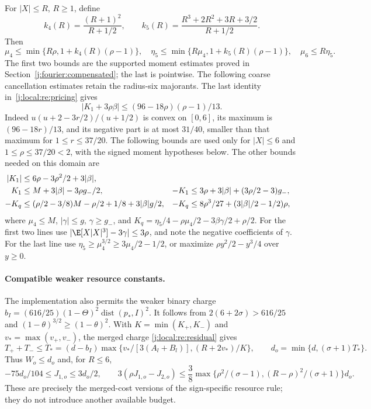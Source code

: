 For $|X|\le R$, $R\ge1$, define
\[
 k_4(R)=\frac{(R+1)^2}{R+1/2},\qquad
 k_5(R)=\frac{R^3+2R^2+3R+3/2}{R+1/2}.
\]
Then
\begin{equation}\label{j:local:mom:universal-moments}
 \mu_4\le\min\{R\rho,1+k_4(R)(\rho-1)\},\quad
 \eta_5\le\min\{R\mu_4,1+k_5(R)(\rho-1)\},\quad
 \mu_6\le R\eta_5.
\end{equation}
The first two bounds are the supported moment estimates proved in
Section~\ref{j:fourier:compensated}; the last is pointwise.
The following coarse cancellation estimates retain the radius-six majorants.
The last identity in~\eqref{j:local:re:pricing} gives
\begin{equation}\label{j:local:mom:K-cancellation}
 |K_1+3\rho\beta|\le(96-18\rho)(\rho-1)/13.
\end{equation}
Indeed $u(u+2-3r/2)/(u+1/2)$ is convex on $[0,6]$, its maximum is
$(96-18r)/13$, and its negative part is at most $31/40$, smaller than that
maximum for $1\le r\le37/20$.
The following bounds are used only for $|X|\le6$ and
$1\le\rho\le37/20<2$, with the signed moment hypotheses below.
The other bounds needed on this domain are
\begin{align}
 |K_1|&\le6\rho-3\rho^2/2+3|\beta|,\notag\\
 K_1&\le M+3|\beta|-3\rho g_-/2,&
 -K_1&\le3\rho+3|\beta|+(3\rho/2-3)g_-,\notag\\
 -K_q&\le(\rho/2-3/8)M-\rho/2+1/8+3|\beta|g/2,&
 -K_q&\le8\rho^3/27+(3|\beta|/2-1/2)\rho,               \label{j:local:mom:K-bounds}
\end{align}
where $\mu_4\le M$, $|\gamma|\le g$, $\gamma\ge g_-$, and
$K_q=\eta_5/4-\rho\mu_4/2-3\beta\gamma/2+\rho/2$.
For the first two lines use
$|\E[X|X|^3]-3\gamma|\le3\rho$, and note the negative coefficients
of $\gamma$. For the last line use
$\eta_5\ge\mu_4^{3/2}\ge3\mu_4/2-1/2$, or maximize
$\rho y^2/2-y^3/4$ over $y\ge0$.


\paragraph{Compatible weaker resource constants.}
The implementation also permits the weaker binary charge
$b_I=(616/25)(1-\Theta)^2\operatorname{dist}(p_*,I)^2$.
It follows from $2(6+2\sigma)>616/25$ and
$(1-\theta)^{3/2}\ge(1-\theta)^2$.
With $K=\min(K_+,K_-)$ and $v_* =\max(v_+,v_-)$, the merged charge
\eqref{j:local:re:residual} gives
\[
 T_++T_-\le T_*=(d-b_I)\max\{v_*/[3(A_l+B_l)],(R+2v_*)/K\},
 \qquad d_o=\min\{d,(\sigma+1)T_*\}.
\]
Thus $W_o\le d_o$ and, for $R\le6$,
\[
 -75d_o/104\le J_{1,o}\le3d_o/2,\qquad
 3(\rho J_{1,o}-J_{2,o})\le\frac38
 \max\{\rho^2/(\sigma-1),(R-\rho)^2/(\sigma+1)\}d_o.
\]
These are precisely the merged-cost versions of the sign-specific
resource rule; they do not introduce another available budget.

